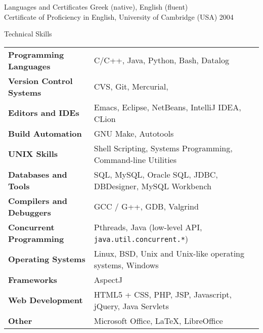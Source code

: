 \documentclass{resume}
\begin{document}
\begin{rSection}{Languages and Certificates}
  Greek (native), English (fluent) \\
  Certificate of Proficiency in English, University of Cambridge (USA)
  \hfill 2004
\end{rSection}


\begin{rSection}{Technical Skills}

{\renewcommand{\arraystretch}{1.3}
\begin{tabular}{ @{} >{\bfseries}l @{\hspace{6ex}} l }

Programming Languages
   & C/C++, Java, Python, Bash,  Datalog \\

Version Control Systems
   & CVS, Git, Mercurial, \\

Editors and IDEs
   & Emacs, Eclipse, NetBeans, IntelliJ IDEA, CLion \\

Build Automation
   & GNU Make, Autotools \\

UNIX Skills
   & Shell Scripting, Systems Programming, Command-line Utilities \\

Databases and Tools
   & SQL, MySQL, Oracle SQL, JDBC, DBDesigner, MySQL Workbench \\

Compilers and Debuggers
   & GCC / G++, GDB, Valgrind \\

Concurrent Programming
   & Pthreads, Java (low-level API, \texttt{java.util.concurrent.*}) \\

Operating Systems
   & Linux, BSD, Unix and Unix-like operating systems, Windows \\

Frameworks
   & AspectJ \\

Web Development
   & HTML5 + CSS, PHP, JSP, Javascript, jQuery, Java Servlets \\

Other
   & Microsoft Office, \LaTeX{}, LibreOffice \\
\end{tabular}}
\end{rSection}
\end{document}
